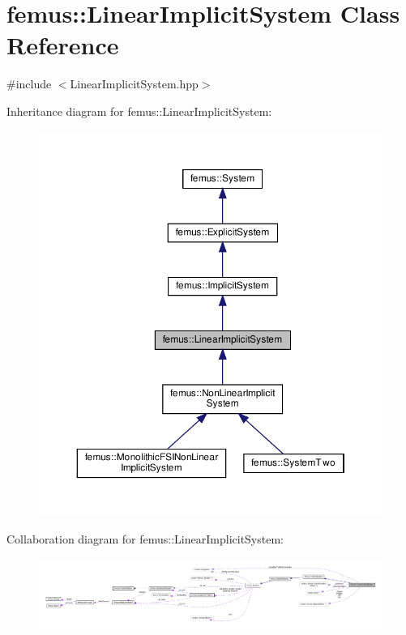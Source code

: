 \hypertarget{classfemus_1_1_linear_implicit_system}{}\section{femus\+:\+:Linear\+Implicit\+System Class Reference}
\label{classfemus_1_1_linear_implicit_system}


{\ttfamily \#include $<$Linear\+Implicit\+System.\+hpp$>$}



Inheritance diagram for femus\+:\+:Linear\+Implicit\+System\+:
\nopagebreak
\begin{figure}[H]
\begin{center}
\leavevmode
\includegraphics[width=350pt]{classfemus_1_1_linear_implicit_system__inherit__graph}
\end{center}
\end{figure}


Collaboration diagram for femus\+:\+:Linear\+Implicit\+System\+:
\nopagebreak
\begin{figure}[H]
\begin{center}
\leavevmode
\includegraphics[width=350pt]{classfemus_1_1_linear_implicit_system__coll__graph}
\end{center}
\end{figure}
